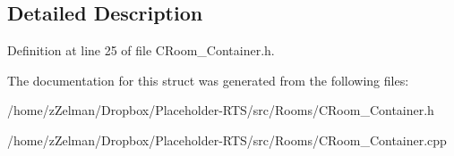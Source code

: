 \subsection{Detailed Description}


Definition at line 25 of file C\-Room\-\_\-\-Container.\-h.



The documentation for this struct was generated from the following files\-:\begin{DoxyCompactItemize}
\item 
/home/z\-Zelman/\-Dropbox/\-Placeholder-\/\-R\-T\-S/src/\-Rooms/C\-Room\-\_\-\-Container.\-h\item 
/home/z\-Zelman/\-Dropbox/\-Placeholder-\/\-R\-T\-S/src/\-Rooms/C\-Room\-\_\-\-Container.\-cpp\end{DoxyCompactItemize}
